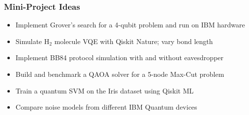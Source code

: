 \begin{frame}[fragile]\frametitle{Mini-Project Ideas}
\begin{itemize}
\item Implement Grover's search for a 4-qubit problem and run on IBM hardware
\item Simulate H$_2$ molecule VQE with Qiskit Nature; vary bond length
\item Implement BB84 protocol simulation with and without eavesdropper
\item Build and benchmark a QAOA solver for a 5-node Max-Cut problem
\item Train a quantum SVM on the Iris dataset using Qiskit ML
\item Compare noise models from different IBM Quantum devices
\end{itemize}
\end{frame}
